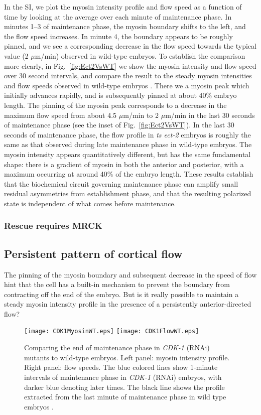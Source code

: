 \documentclass[11pt]{article}
\newcommand{\6}[1]{#1_{\text{6}}}
\newcommand{\3}[1]{#1_{\text{3}}}
\begin{document}
In the SI, we plot the myosin intensity profile and flow speed as a function of time by looking at the average over each minute of maintenance phase. In minutes 1--3 of maintenance phase, the myosin boundary shifts to the left, and the flow speed increases. In minute 4, the boundary appears to be roughly pinned, and we see a corresponding decrease in the flow speed towards the typical value (2 $\mu$m/min) observed in wild-type embryos. To establish the comparison more clearly, in Fig.\ \ref{fig:Ect2VsWT} we show the myosin intensity and flow speed over 30 second intervals, and compare the result to the steady myosin intensities and flow speeds observed in wild-type embryos \cite{sailer2015dynamic}. There we a myosin peak which initially advances rapidly, and is subsequently pinned at about 40\% embryo length. The pinning of the myosin peak corresponds to a decrease in the maximum flow speed from about 4.5 $\mu$m/min to 2 $\mu$m/min in the last 30 seconds of maintenance phase (see the inset of Fig.\ \ref{fig:Ect2VsWT}). In the last 30 seconds of maintenance phase, the flow profile in \emph{ts ect-2} embryos is roughly the same as that observed during late maintenance phase in wild-type embryos. The myosin intensity appears quantitatively different, but has the same fundamental shape: there is a gradient of myosin in both the anterior and posterior, with a maximum occurring at around 40\% of the embryo length. These results establish that the biochemical circuit governing maintenance phase can amplify small residual asymmetries from establishment phase, and that the resulting polarized state is independent of what comes before maintenance.

\subsubsection{Rescue requires MRCK}

\subsection{Persistent pattern of cortical flow}
The pinning of the myosin boundary and subsequent decrease in the speed of flow hint that the cell has a built-in mechanism to prevent the boundary from contracting off the end of the embryo. But is it really possible to maintain a steady myosin intensity profile in the presence of a persistently anterior-directed flow? 

\begin{figure}
\centering
\texttt{[image: CDK1MyosinWT.eps]}
\texttt{[image: CDK1FlowWT.eps]}
\caption{\label{fig:CDK1VsWT} Comparing the end of maintenance phase in \emph{CDK-1} (RNAi) mutants to wild-type embryos. Left panel: myosin intensity profile. Right panel: flow speeds. The blue colored lines show 1-minute intervals of maintenance phase in \emph{CDK-1} (RNAi) embryos, with darker blue denoting later times. The black line shows the profile extracted from the last minute of maintenance phase in wild type embryos \cite{sailer2015dynamic}.}
\end{figure}
\end{document}
